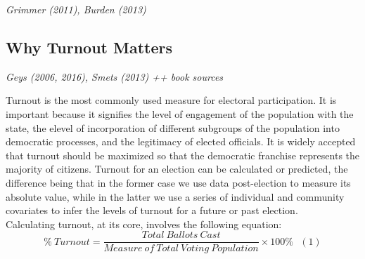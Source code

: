\documentclass[12pt,twoside]{reedthesis}
\begin{document}
  \emph{Grimmer (2011), Burden (2013)}
  
  \subsection{Why Turnout Matters}\label{why-turnout-matters}
  
  \emph{Geys (2006, 2016), Smets (2013) ++ book sources}
  
  Turnout is the most commonly used measure for electoral participation.
  It is important because it signifies the level of engagement of the
  population with the state, the elevel of incorporation of different
  subgroups of the population into democratic processes, and the
  legitimacy of elected officials. It is widely accepted that turnout
  should be maximized so that the democratic franchise represents the
  majority of citizens. Turnout for an election can be calculated or
  predicted, the difference being that in the former case we use data
  post-election to measure its absolute value, while in the latter we use
  a series of individual and community covariates to infer the levels of
  turnout for a future or past election.\\
  Calculating turnout, at its core, involves the following equation:\\
  \[ \% ~Turnout = \frac{Total~Ballots~Cast}{Measure~of~Total~Voting~Population}\times100\%~~~(1)\]
  
\end{document}
